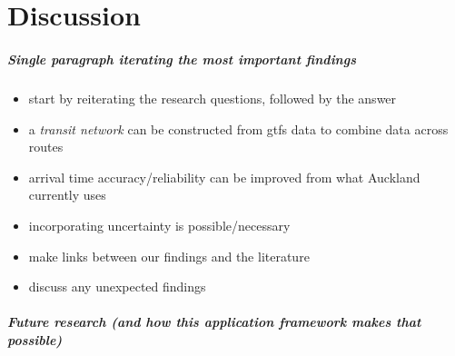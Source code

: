 
\chapter{Discussion}
\label{cha:discussion}


\paragraph{Single paragraph iterating the most important findings}

\begin{itemize}
\item start by reiterating the research questions, followed by the answer
\item a \emph{transit network} can be constructed from \gls{gtfs} data to combine data across routes
\item arrival time accuracy/reliability can be improved from what Auckland currently uses
\item incorporating uncertainty is possible/necessary
\item make links between our findings and the literature
\item discuss any unexpected findings
\end{itemize}


\paragraph{Future research (and how this application framework makes that possible)}
